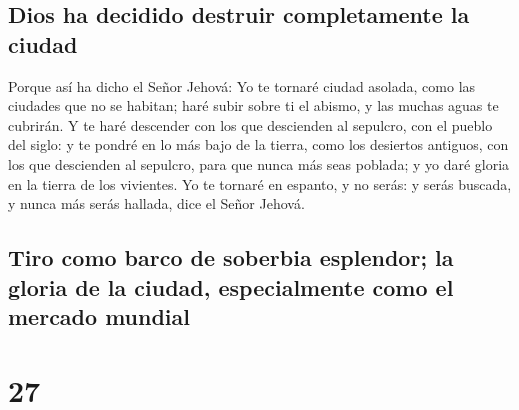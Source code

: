\hypertarget{dios-ha-decidido-destruir-completamente-la-ciudad}{%
\subsection{Dios ha decidido destruir completamente la
ciudad}\label{dios-ha-decidido-destruir-completamente-la-ciudad}}

 Porque así ha dicho el Señor Jehová: Yo te tornaré ciudad
asolada, como las ciudades que no se habitan; haré subir sobre ti el
abismo, y las muchas aguas te cubrirán.  Y te haré
descender con los que descienden al sepulcro, con el pueblo del siglo: y
te pondré en lo más bajo de la tierra, como los desiertos antiguos, con
los que descienden al sepulcro, para que nunca más seas poblada; y yo
daré gloria en la tierra de los vivientes.  Yo te tornaré
en espanto, y no serás: y serás buscada, y nunca más serás hallada, dice
el Señor Jehová.

\hypertarget{tiro-como-barco-de-soberbia-esplendor-la-gloria-de-la-ciudad-especialmente-como-el-mercado-mundial}{%
\subsection{Tiro como barco de soberbia esplendor; la gloria de la
ciudad, especialmente como el mercado
mundial}\label{tiro-como-barco-de-soberbia-esplendor-la-gloria-de-la-ciudad-especialmente-como-el-mercado-mundial}}

\hypertarget{section-26}{%
\section{27}\label{section-26}}

